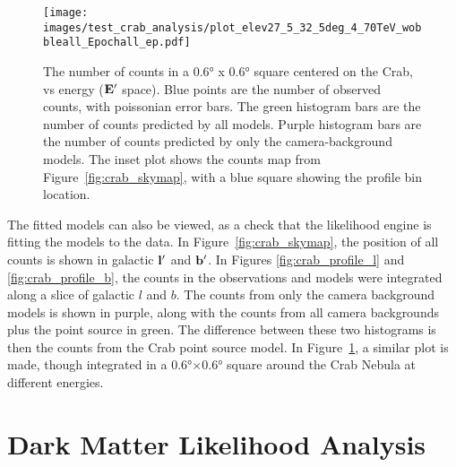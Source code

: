   \begin{figure}[h]
    \centering
    \texttt{[image: images/test\_crab\_analysis/plot\_elev27\_5\_32\_5deg\_4\_70TeV\_wobbleall\_Epochall\_ep.pdf]}
    \caption[Crab Profile in Energy]
    {
      The number of counts in a \ang{0.6} x \ang{0.6} square centered on the Crab, vs energy ($\mathbf{E'}$ space).
      Blue points are the number of observed counts, with poissonian error bars.
      The green histogram bars are the number of counts predicted by all models.
      Purple histogram bars are the number of counts predicted by only the camera-background models.
      The inset plot shows the counts map from Figure~\ref{fig:crab_skymap}, with a blue square showing the profile bin location.
    }
    \label{fig:crab_profile_energy}
  \end{figure}
    
  The fitted models can also be viewed, as a check that the likelihood engine is fitting the models to the data.
  In Figure~\ref{fig:crab_skymap}, the position of all counts is shown in galactic $\mathbf{l'}$ and $\mathbf{b'}$.
  In Figures \ref{fig:crab_profile_l} and \ref{fig:crab_profile_b}, the counts in the observations and models were integrated along a slice of galactic $l$ and $b$.
  The counts from only the camera background models is shown in purple, along with the counts from all camera backgrounds plus the point source in green.
  The difference between these two histograms is then the counts from the Crab point source model.
  In Figure~\ref{fig:crab_profile_energy}, a similar plot is made, though integrated in a \ang{0.6}$\times$\ang{0.6} square around the Crab Nebula at different energies.

  \FloatBarrier

\section{Dark Matter Likelihood Analysis}\label{sec:dmlike}
  
